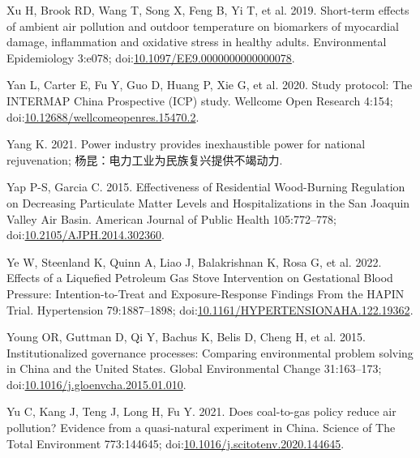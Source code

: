 \documentclass[
  letterpaper,
  DIV=11,
  numbers=noendperiod]{scrartcl}
\newlength{\cslhangindent}
\newlength{\cslentryspacingunit} %
\newenvironment{CSLReferences}[2] %
 {%
  \setlength{\parindent}{0pt}
  \ifodd #1
  \let\oldpar\par
  \def\par{\hangindent=\cslhangindent\oldpar}
  \fi
  \setlength{\parskip}{#2\cslentryspacingunit}
 }%
 {}
\begin{document}
\begin{CSLReferences}{1}{0}
\leavevmode{}%
Xu H, Brook RD, Wang T, Song X, Feng B, Yi T, et al. 2019. Short-term
effects of ambient air pollution and outdoor temperature on biomarkers
of myocardial damage, inflammation and oxidative stress in healthy
adults. Environmental Epidemiology 3:e078;
doi:\href{https://doi.org/10.1097/EE9.0000000000000078}{10.1097/EE9.0000000000000078}.

\leavevmode{}%
Yan L, Carter E, Fu Y, Guo D, Huang P, Xie G, et al. 2020. Study
protocol: {The INTERMAP China Prospective} ({ICP}) study. Wellcome Open
Research 4:154;
doi:\href{https://doi.org/10.12688/wellcomeopenres.15470.2}{10.12688/wellcomeopenres.15470.2}.

\leavevmode{}%
Yang K. 2021. Power industry provides inexhaustible power for national
rejuvenation; 杨昆：电力工业为民族复兴提供不竭动力.

\leavevmode{}%
Yap P-S, Garcia C. 2015. Effectiveness of {Residential Wood-Burning
Regulation} on {Decreasing Particulate Matter Levels} and
{Hospitalizations} in the {San Joaquin Valley Air Basin}. American
Journal of Public Health 105:772--778;
doi:\href{https://doi.org/10.2105/AJPH.2014.302360}{10.2105/AJPH.2014.302360}.

\leavevmode{}%
Ye W, Steenland K, Quinn A, Liao J, Balakrishnan K, Rosa G, et al. 2022.
Effects of a {Liquefied Petroleum Gas Stove Intervention} on
{Gestational Blood Pressure}: {Intention-to-Treat} and
{Exposure-Response Findings From} the {HAPIN Trial}. Hypertension
79:1887--1898;
doi:\href{https://doi.org/10.1161/HYPERTENSIONAHA.122.19362}{10.1161/HYPERTENSIONAHA.122.19362}.

\leavevmode{}%
Young OR, Guttman D, Qi Y, Bachus K, Belis D, Cheng H, et al. 2015.
Institutionalized governance processes: {Comparing} environmental
problem solving in {China} and the {United States}. Global Environmental
Change 31:163--173;
doi:\href{https://doi.org/10.1016/j.gloenvcha.2015.01.010}{10.1016/j.gloenvcha.2015.01.010}.

\leavevmode{}%
Yu C, Kang J, Teng J, Long H, Fu Y. 2021. Does coal-to-gas policy reduce
air pollution? {Evidence} from a quasi-natural experiment in {China}.
Science of The Total Environment 773:144645;
doi:\href{https://doi.org/10.1016/j.scitotenv.2020.144645}{10.1016/j.scitotenv.2020.144645}.


\end{CSLReferences}
\end{document}
